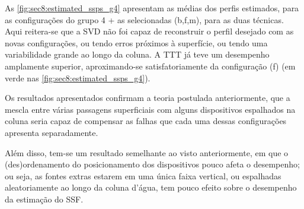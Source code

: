 

\const As \cref{fig:sec8:estimated_ssps_g4} apresentam as médias dos perfis estimados, para as configurações do grupo 4 + as selecionadas (b,f,m), para as duas técnicas. Aqui reitera-se que a SVD não foi capaz de reconstruir o perfil desejado com as novas configurações, ou tendo erros próximos à superfície, ou tendo uma variabilidade grande ao longo da coluna. A TTT já teve um desempenho amplamente superior, aproximando-se satisfatoriamente da configuração (f) (em verde nas \cref{fig:sec8:estimated_ssps_g4}).



\const Os resultados apresentados confirmam a teoria postulada anteriormente, que a mescla entre várias passagens superficiais com alguns dispositivos espalhados na coluna seria capaz de compensar as falhas que cada uma dessas configurações apresenta separadamente.

\const Além disso, tem-se um resultado semelhante ao visto anteriormente, em que o (des)orde\-namento do posicionamento dos dispositivos pouco afeta o desempenho; ou seja, as fontes extras estarem em uma única faixa vertical, ou espalhadas aleatoriamente ao longo da coluna d'água, tem pouco efeito sobre o desempenho da estimação do SSF.


